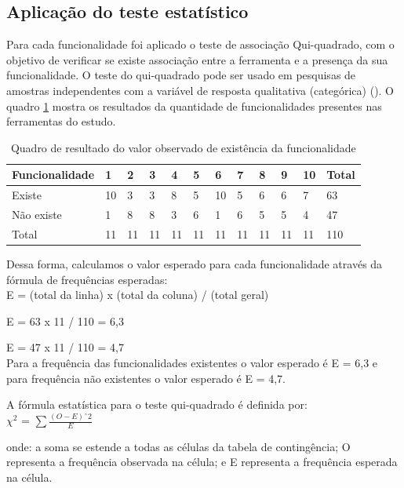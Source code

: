 \subsection{Aplicação do teste estatístico}

Para cada funcionalidade foi aplicado o teste de associação Qui-quadrado, com o objetivo de verificar se existe associação entre a ferramenta e a presença da sua funcionalidade. O teste do qui-quadrado pode ser usado em pesquisas de amostras independentes com a variável de resposta qualitativa (categórica) (\cite{barbetta:2012}). O quadro \ref{distribuicao} mostra os resultados da quantidade de funcionalidades presentes nas ferramentas do estudo.

\begin{table}
	\centering
	\caption{Quadro de resultado do valor observado de existência da funcionalidade}
	\label{distribuicao}
	\begin{tabular}{|l|l|l|l|l|l|l|l|l|l|l|l|}
		\hline
		Funcionalidade & 1 & 2 & 3 & 4 & 5 & 6 & 7 & 8 & 9 & 10 & Total \\ \hline
		Existe & 10 & 3 & 3 & 8 & 5 & 10 & 5 & 6 & 6 & 7 & 63 \\ \hline
		Não existe & 1 & 8 & 8 & 3 & 6 & 1 & 6 & 5 & 5 & 4 & 47 \\ \hline
		Total & 11 & 11 & 11 & 11 & 11 & 11 & 11 & 11 & 11 & 11 & 110 \\ \hline
	\end{tabular}
\end{table}

Dessa forma, calculamos o valor esperado para cada funcionalidade através da fórmula de frequências esperadas:
\\

E = (total da linha) x (total da coluna) / (total geral)

E = 63 x 11 / 110 = 6,3

E = 47 x 11 / 110 = 4,7
\\

Para a frequência das funcionalidades existentes o valor esperado é E = 6,3 e para frequência não existentes o valor esperado é E = 4,7.


A fórmula estatística para o teste qui-quadrado é definida por:
\\


 $ \chi^2 $ = $\sum \frac{(O-E)ˆ2}{E}$


 onde:
 a soma se estende a todas as células da tabela de contingência; 
 O representa a frequência observada na célula; e
 E representa a frequência esperada na célula.

